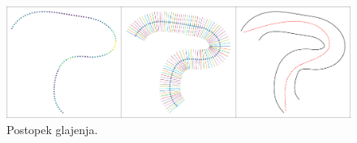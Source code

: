 \begin{figure}[H]
	\centering
	\includegraphics[width=15cm]{pic/slika6.png}
	\caption{Postopek glajenja.}
	\label{fig:slika}
\end{figure}


%
%
%
